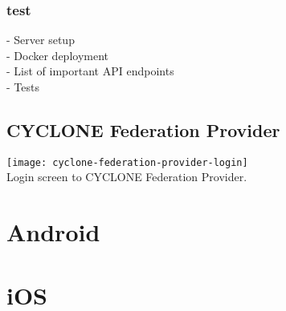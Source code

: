 \subsubsection{test}

- Server setup\\
- Docker deployment\\
- List of important API endpoints\\
- Tests

\subsection{CYCLONE Federation Provider}
\label{federation-provider}

\begin{center}
    \texttt{[image: cyclone-federation-provider-login]}\\
    Login screen to CYCLONE Federation Provider.
\end{center}


\vspace{0.5cm}

\section{Android}


\vspace{0.5cm}

\section{iOS}
